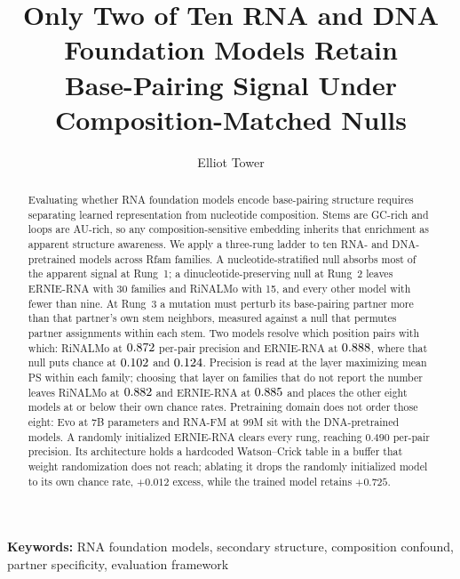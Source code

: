 \documentclass[11pt]{article}
\title{Only Two of Ten RNA and DNA Foundation Models Retain\\Base-Pairing Signal Under Composition-Matched Nulls}
\author{Elliot Tower}
\affil{Independent researcher \\ \texttt{elliot@elliottower.ai}}
\date{}
\begin{document}
\maketitle

\noindent\textbf{Keywords:} RNA foundation models, secondary structure, composition confound, partner specificity, evaluation framework

\begin{abstract}
Evaluating whether RNA foundation models encode base-pairing structure requires
separating learned representation from nucleotide composition. Stems are GC-rich
and loops are AU-rich, so any composition-sensitive embedding inherits that
enrichment as apparent structure awareness. We apply a three-rung ladder to ten
RNA- and DNA-pretrained models across \panelN{} Rfam families. A
nucleotide-stratified null absorbs most of the apparent signal at Rung~1; a
dinucleotide-preserving null at Rung~2 leaves ERNIE-RNA with 30 families and
RiNALMo with 15, and every other model with fewer than nine. At Rung~3 a
mutation must perturb its base-pairing partner more than that partner's own stem
neighbors, measured against a null that permutes partner assignments within
each stem. Two models resolve which position pairs with which: RiNALMo at
$0.872{}$ per-pair precision and ERNIE-RNA at
$0.888{}$, where that null puts chance at
$0.102{}$ and $0.124{}$. Precision is read at the
layer maximizing mean PS within each family; choosing that layer on families
that do not report the number leaves RiNALMo at $0.882{}$ and
ERNIE-RNA at $0.885{}$ and places the other eight models at or
below their own chance rates. Pretraining domain does not order
those eight: Evo at 7B parameters and RNA-FM at 99M sit with the
DNA-pretrained models.
A randomly initialized ERNIE-RNA clears every rung, reaching $0.490$ per-pair
precision. Its architecture holds a hardcoded Watson--Crick table in a buffer
that weight randomization does not reach; ablating it drops the randomly
initialized model to its own chance rate, $+0.012$ excess, while the trained
model retains $+0.725$.
\end{abstract}

\end{document}
